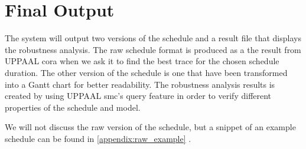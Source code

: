 \section{Final Output}\label{sec:final}
The system will output two versions of the schedule and a result file that displays the robustness analysis. The raw schedule format is produced as a the result from UPPAAL \gls{cora} when we ask it to find the best trace for the chosen schedule duration. The other version of the schedule is one that have been transformed into a Gantt chart for better readability. The robustness analysis results is created by using UPPAAL \gls{smc}'s query feature in order to verify different properties of the schedule and model.

We will not discuss the raw version of the schedule, but a snippet of an example schedule can be found in \cref{appendix:raw_example} .



